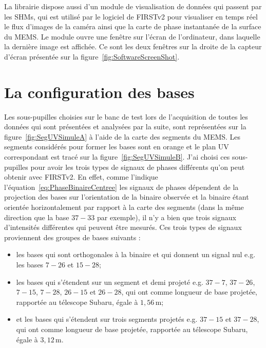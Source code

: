 La librairie dispose aussi d'un module de visualisation de données qui passent par les \ac{SHM}s, qui est utilisé par le logiciel de \ac{FIRSTv2} pour visualiser en temps réel le flux d'images de la caméra ainsi que la carte de phase instantanée de la surface du \ac{MEMS}. Le module ouvre une fenêtre sur l'écran de l'ordinateur, dans laquelle la dernière image est affichée. Ce sont les deux fenêtres sur la droite de la capteur d'écran présentée sur la figure~\ref{fig:SoftwareScreenShot}.


\section{La configuration des bases}
\label{sec:BaseConfig}

Les sous-pupilles choisies sur le banc de test lors de l'acquisition de toutes les données qui sont présentées et analysées par la suite, sont représentées sur la figure~\ref{fig:SegUVSimuleA} à l'aide de la carte des segments du \ac{MEMS}. Les segments considérés pour former les bases sont en orange et le plan UV correspondant est tracé sur la figure~\ref{fig:SegUVSimuleB}. J'ai choisi ces sous-pupilles pour avoir les trois types de signaux de phases différents qu'on peut obtenir avec \ac{FIRSTv2}. En effet, comme l'indique l'équation~\ref{eq:PhaseBinaireCentree} les signaux de phases dépendent de la projection des bases sur l'orientation de la binaire observée et la binaire étant orientée horizontalement par rapport à la carte des segments (dans la même direction que la base $37-33$ par exemple), il n'y a bien que trois signaux d'intensités différentes qui peuvent être mesurés. Ces trois types de signaux proviennent des groupes de bases suivants :
\begin{itemize}
    \item les bases qui sont orthogonales à la binaire et qui donnent un signal nul e.g. les bases $7-26$ et $15-28$;
    \item les bases qui s'étendent sur un segment et demi projeté e.g. $37-7$, $37-26$, $7-15$, $7-28$, $26-15$ et $26-28$, qui ont comme longueur de base projetée, rapportée au télescope Subaru, égale à $1,56 \,$m;
    \item et les bases qui s'étendent sur trois segments projetés e.g. $37-15$ et $37-28$, qui ont comme longueur de base projetée, rapportée au télescope Subaru, égale à $3,12 \,$m.
\end{itemize}

